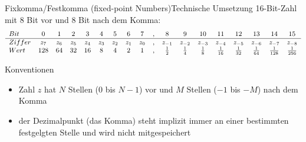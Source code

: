 \documentclass[xelatex,aspectratio=169]{beamer}
\begin{document}
\begin{frame}[t]{Fixkomma/Festkomma (fixed-point Numbers)}{Technische Umsetzung}
  16-Bit-Zahl mit 8 Bit vor und 8 Bit nach dem Komma:
  \[
    \small
    \begin{array}{lccccccccccccccccc}
      Bit    & 0   & 1   & 2   & 3   & 4   & 5   & 6   & 7   & , & 8           & 9           & 10          & 11           & 12           & 13           & 14            & 15            \\
      \hline
      Ziffer & z_7 & z_6 & z_5 & z_4 & z_3 & z_2 & z_1 & z_0 & , & z_{-1}      & z_{-2}      & z_{-3}      & z_{-4}       & z_{-5}       & z_{-6}       & z_{-7}        & z_{-8}        \\
      Wert   & 128 & 64  & 32  & 16  & 8   & 4   & 2   & 1   & , & \frac{1}{2} & \frac{1}{4} & \frac{1}{8} & \frac{1}{16} & \frac{1}{32} & \frac{1}{64} & \frac{1}{128} & \frac{1}{256}
    \end{array}
  \]
  \begin{block}{Konventionen}
    \begin{itemize}
      \item Zahl $z$ hat $N$ Stellen ($0$ bis $N-1$) vor und $M$ Stellen ($-1$ bis $-M$) nach dem Komma
      \item der Dezimalpunkt (das Komma) steht implizit immer an einer bestimmten festgelgten Stelle und wird nicht mitgespeichert
    \end{itemize}

  \end{block}
\end{frame}
\end{document}
